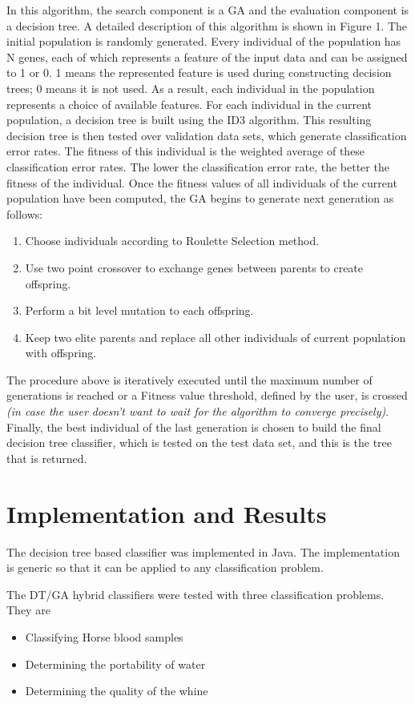 \documentclass[conference]{IEEEtran}
\begin{document}
In this algorithm, the search component is a GA and the
evaluation component is a decision tree. A detailed description of
this algorithm is shown in Figure 1. The initial population is
randomly generated. Every individual of the population has N
genes, each of which represents a feature of the input data and
can be assigned to 1 or 0. 1 means the represented feature is used
during constructing decision trees; 0 means it is not used. As a
result, each individual in the population represents a choice of
available features. For each individual in the current population, a
decision tree is built using the ID3 algorithm. This resulting
decision tree is then tested over validation data sets, which
generate classification error rates. The fitness of this
individual is the weighted average of these classification error rates.
The lower the classification error rate, the better the fitness of the
individual.
Once the fitness values of all individuals of the current population
have been computed, the GA begins to generate next generation
as follows:
\begin{enumerate}
\item{}Choose individuals according to Roulette Selection method.
\item{}Use two point crossover to exchange genes between parents to
create offspring.
\item{}Perform a bit level mutation to each offspring.
\item{}Keep two elite parents and replace all other individuals of
current population with offspring.
\end{enumerate}
The procedure above is iteratively executed until the maximum
number of generations is reached or a Fitness value threshold, defined by the user, is crossed \textit{(in case the user doesn't want to wait for the algorithm to converge precisely)}. Finally, the best
individual of the last generation is chosen to build the final
decision tree classifier, which is tested on the test data set, and this is the tree that is returned.

\section{Implementation and Results}
The decision tree based classifier was implemented in Java. The implementation is generic so that it can be applied to any classification problem.


The DT/GA hybrid classifiers were tested with three classification problems. They are
\begin{itemize}
\item{Classifying Horse blood samples}
\item{Determining the portability of water}
\item{Determining the quality of the whine}
\end{itemize}
\end{document}
